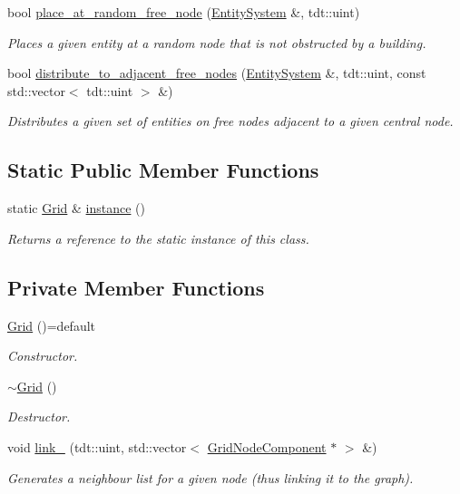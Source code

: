 \begin{DoxyCompactItemize}
\item 
bool \hyperlink{class_grid_a0349c650a4fd69e5f6f886af05314b92}{place\+\_\+at\+\_\+random\+\_\+free\+\_\+node} (\hyperlink{class_entity_system}{Entity\+System} \&, tdt\+::uint)
\begin{DoxyCompactList}\small\item\em Places a given entity at a random node that is not obstructed by a building. \end{DoxyCompactList}\item 
bool \hyperlink{class_grid_adbc7f36dcab8375df8365de3506e7fcc}{distribute\+\_\+to\+\_\+adjacent\+\_\+free\+\_\+nodes} (\hyperlink{class_entity_system}{Entity\+System} \&, tdt\+::uint, const std\+::vector$<$ tdt\+::uint $>$ \&)
\begin{DoxyCompactList}\small\item\em Distributes a given set of entities on free nodes adjacent to a given central node. \end{DoxyCompactList}\end{DoxyCompactItemize}
\subsection*{Static Public Member Functions}
\begin{DoxyCompactItemize}
\item 
static \hyperlink{class_grid}{Grid} \& \hyperlink{class_grid_a6ce0a23ca91244b4eee86ba8072cb56d}{instance} ()
\begin{DoxyCompactList}\small\item\em Returns a reference to the static instance of this class. \end{DoxyCompactList}\end{DoxyCompactItemize}
\subsection*{Private Member Functions}
\begin{DoxyCompactItemize}
\item 
\hyperlink{class_grid_a775ad2cbbd0fa863c84748eccdb707ad}{Grid} ()=default
\begin{DoxyCompactList}\small\item\em Constructor. \end{DoxyCompactList}\item 
\hyperlink{class_grid_a3661d0a7f998caaaf8627d7a67072116}{$\sim$\+Grid} ()
\begin{DoxyCompactList}\small\item\em Destructor. \end{DoxyCompactList}\item 
void \hyperlink{class_grid_aa821d856e6306de7af1553e1f00870e6}{link\+\_\+} (tdt\+::uint, std\+::vector$<$ \hyperlink{struct_grid_node_component}{Grid\+Node\+Component} $\ast$ $>$ \&)
\begin{DoxyCompactList}\small\item\em Generates a neighbour list for a given node (thus linking it to the graph). \end{DoxyCompactList}\end{DoxyCompactItemize}
